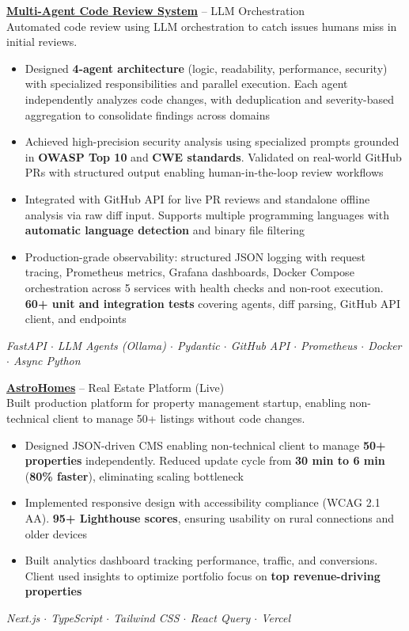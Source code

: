 \documentclass[10pt,letterpaper]{article}
\newcommand{\headerlink}[2]{\href{#1}{#2}}
\begin{document}
\textbf{\headerlink{https://github.com/lsvishaal/Lyzer_PR_Review}{Multi-Agent Code Review System}} -- LLM Orchestration \\
Automated code review using LLM orchestration to catch issues humans miss in initial reviews.
\begin{itemize}
  \item Designed \textbf{4-agent architecture} (logic, readability, performance, security) with specialized responsibilities and parallel execution. Each agent independently analyzes code changes, with deduplication and severity-based aggregation to consolidate findings across domains
  \item Achieved high-precision security analysis using specialized prompts grounded in \textbf{OWASP Top 10} and \textbf{CWE standards}. Validated on real-world GitHub PRs with structured output enabling human-in-the-loop review workflows
  \item Integrated with GitHub API for live PR reviews and standalone offline analysis via raw diff input. Supports multiple programming languages with \textbf{automatic language detection} and binary file filtering
  \item Production-grade observability: structured JSON logging with request tracing, Prometheus metrics, Grafana dashboards, Docker Compose orchestration across 5 services with health checks and non-root execution. \textbf{60+ unit and integration tests} covering agents, diff parsing, GitHub API client, and endpoints
\end{itemize}
\textit{FastAPI $\cdot$ LLM Agents (Ollama) $\cdot$ Pydantic $\cdot$ GitHub API $\cdot$ Prometheus $\cdot$ Docker $\cdot$ Async Python}

\textbf{\headerlink{https://www.astrohomes.in}{AstroHomes}} -- Real Estate Platform (Live) \\
Built production platform for property management startup, enabling non-technical client to manage 50+ listings without code changes.
\begin{itemize}
  \item Designed JSON-driven CMS enabling non-technical client to manage \textbf{50+ properties} independently. Reduced update cycle from \textbf{30 min to 6 min} (\textbf{80\% faster}), eliminating scaling bottleneck
  \item Implemented responsive design with accessibility compliance (WCAG 2.1 AA). \textbf{95+ Lighthouse scores}, ensuring usability on rural connections and older devices
  \item Built analytics dashboard tracking performance, traffic, and conversions. Client used insights to optimize portfolio focus on \textbf{top revenue-driving properties}
\end{itemize}
\textit{Next.js $\cdot$ TypeScript $\cdot$ Tailwind CSS $\cdot$ React Query $\cdot$ Vercel}
\end{document}
